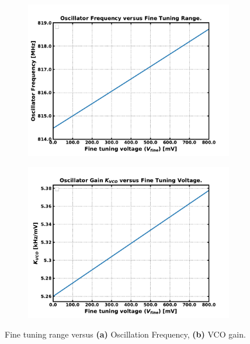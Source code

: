 	\begin{figure}[htb!]
	    \centering
	    \begin{subfigure}{0.5\textwidth}
	        \centering
	        \includegraphics[width=1\textwidth, angle=0]{./figs/results/osc_f_vs_fine}
	        \caption{ }
	        \label{fig:osc_f_vs_fine}
	    \end{subfigure}%
	    \begin{subfigure}{0.5\textwidth}
	        \centering
	        \includegraphics[width=1\textwidth, angle=0]{./figs/results/osc_f_gain_vs_fine}
	        \caption{ }
	        \label{fig:osc_f_gain_vs_fine}
	    \end{subfigure}
	    \label{fig:osc_f_fine_tune}
	    \caption{Fine tuning range versus \textbf{(a)} Oscillation Frequency, \textbf{(b)} VCO gain.}
	\end{figure} 



